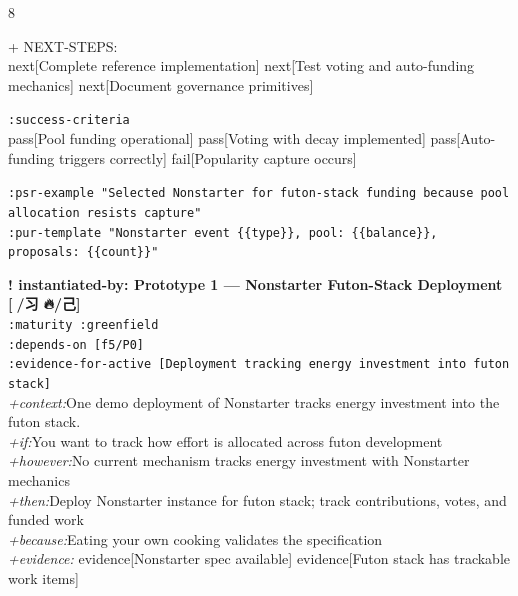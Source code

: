 \documentclass[landscape]{article}
\newcommand{\flexitag}[1]{\textcolor[gray]{0.35}{\textit{#1}}}
\newenvironment{devmapactive}{%
  \def\FrameCommand{\colorbox{devmapactivebg}}%
  \setlength{\fboxsep}{2pt}%
  \MakeFramed{\advance\hsize-\width \FrameRestore}%
}{\endMakeFramed}
\newenvironment{devmapgreenfield}{%
  \def\FrameCommand{\colorbox{devmapgreenfieldbg}}%
  \setlength{\fboxsep}{2pt}%
  \MakeFramed{\advance\hsize-\width \FrameRestore}%
}{\endMakeFramed}
\begin{document}
\begin{paracol}{8}
\begin{devmapactive}
\par
  + NEXT-STEPS:\\
    next[Complete reference implementation] next[Test voting and auto-funding mechanics] next[Document governance primitives]\\
\par
  \texttt{:\allowbreak{}success-\allowbreak{}criteria}\\
    pass[Pool funding operational] pass[Voting with decay implemented] pass[Auto-funding triggers correctly] fail[Popularity capture occurs]\\
\par
  \texttt{:\allowbreak{}psr-\allowbreak{}example "Selected Nonstarter for futon-\allowbreak{}stack funding because pool allocation resists capture"}\\
  \texttt{:\allowbreak{}pur-\allowbreak{}template "Nonstarter event \{\{type\}\},\allowbreak{} pool:\allowbreak{} \{\{balance\}\},\allowbreak{} proposals:\allowbreak{} \{\{count\}\}"}\\
\par
\par
\end{devmapactive}
\begin{devmapgreenfield}
\textbf{! instantiated-by: Prototype 1 — Nonstarter Futon-Stack Deployment [🌲/习 🔥/己]}\\
  \texttt{:\allowbreak{}maturity :\allowbreak{}greenfield}\\
  \texttt{:\allowbreak{}depends-\allowbreak{}on [f5/\allowbreak{}P0]}\\
  \texttt{:\allowbreak{}evidence-\allowbreak{}for-\allowbreak{}active [Deployment tracking energy investment into futon stack]}\\
  \flexitag{+context:}One demo deployment of Nonstarter tracks energy investment into the futon stack.\\
  \flexitag{+if:}You want to track how effort is allocated across futon development\\
  \flexitag{+however:}No current mechanism tracks energy investment with Nonstarter mechanics\\
  \flexitag{+then:}Deploy Nonstarter instance for futon stack; track contributions, votes, and funded work\\
  \flexitag{+because:}Eating your own cooking validates the specification\\
  \flexitag{+evidence:} evidence[Nonstarter spec available] evidence[Futon stack has trackable work items]\\

\end{devmapgreenfield}
\end{paracol}
\end{document}
